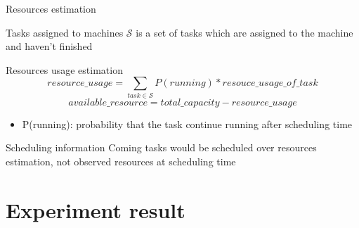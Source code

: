 \documentclass[10pt,xcolor={dvipsnames}, aspectratio=169]{beamer}
\begin{document}
\begin{frame}
{Resources estimation}
	
	\begin{block}
	{Tasks assigned to machines}
		$\mathcal{S}$ is a set of tasks which are assigned to the machine and haven't finished
	\end{block}		
	
	\begin{block}
	{Resources usage estimation}
		\begin{equation*}
			resource\_usage = \sum_{task \in \mathcal{S}}{P(running) * resouce\_usage\_of\_task}
		\end{equation*}
		\begin{equation*}
			available\_resource = total\_capacity - resource\_usage
		\end{equation*}
		\begin{itemize}
			\item P(running): probability that the task continue running after scheduling time
		\end{itemize}
	\end{block}
	\begin{block}
	{Scheduling information}
		Coming tasks would be scheduled over resources estimation, not observed resources at scheduling time
	\end{block}
\end{frame}

\section{Experiment result}
\end{document}
